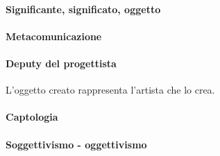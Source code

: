 \documentclass[11pt,a4paper]{book}
\begin{document}
\paragraph{Significante, significato, oggetto}


\paragraph{Metacomunicazione}


\paragraph{Deputy del progettista}
L'oggetto creato rappresenta l'artista che lo crea.

\paragraph{Captologia}


\paragraph{Soggettivismo - oggettivismo}
\end{document}
